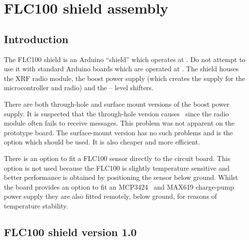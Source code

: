 \chapter{FLC100 shield assembly}

\section{Introduction}
The FLC100 shield is an Arduino ``shield'' which operates at
. Do not attempt to use it with standard Arduino boards
which are operated at . The shield houses the XRF radio
module, the boost power supply (which creates the  supply
for the microcontroller and radio) and the  --  level
shifters.

There are both through-hole and surface mount versions of the boost
power supply. It is suspected that the through-hole version causes
\rfi\ since the radio module often fails to receive messages. This
problem was not apparent on the prototype board. The surface-mount
version has no such problems and is the option which should be
used. It is also cheaper and more efficient.

There is an option to fit a FLC100 sensor directly to the circuit
board. This option is not used because the FLC100 is slightly
temperature sensitive and better performance is obtained by
positioning the sensor below ground. Whilst the board provides an
option to fit an MCP3424 \adc\ and MAX619 charge-pump power supply they
are also fitted remotely, below ground, for reasons of temperature
stability.

\section{FLC100 shield version 1.0}

